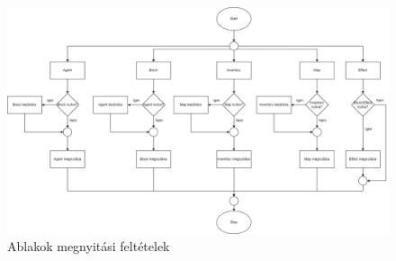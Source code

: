 \begin{figure}[!ht]
	\centering
	\includegraphics[scale=0.2]{images/uiopen.png}
	\caption{Ablakok megnyitási feltételek}
	\label{fig:Ablakok megnyitásaának feltételei}
\end{figure}